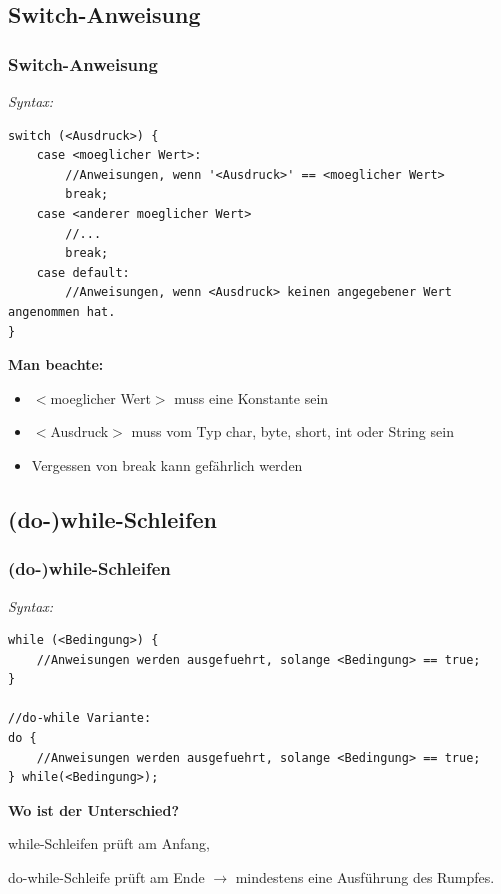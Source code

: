 \documentclass[18pt]{beamer}
\begin{document}
\subsection{Switch-Anweisung}
\begin{frame}[containsverbatim]
	\frametitle{Switch-Anweisung}
	
		\emph{Syntax:}
		\begin{lstlisting}
switch (<Ausdruck>) {
	case <moeglicher Wert>:
		//Anweisungen, wenn '<Ausdruck>' == <moeglicher Wert>
		break;
	case <anderer moeglicher Wert>
		//...
		break;
	case default:
		//Anweisungen, wenn <Ausdruck> keinen angegebener Wert angenommen hat.
}\end{lstlisting}
		\textbf{Man beachte:}
		\begin{itemize}
			\item $<$moeglicher Wert$>$ muss eine Konstante sein
			\item $<$Ausdruck$>$ muss vom Typ char, byte, short, int oder String sein
			\item Vergessen von break kann gefährlich werden
		\end{itemize}
\end{frame}


\subsection{(do-)while-Schleifen}
\begin{frame}[containsverbatim]
	\frametitle{(do-)while-Schleifen }
	
	\emph{Syntax:}
	\begin{lstlisting}
while (<Bedingung>) {
	//Anweisungen werden ausgefuehrt, solange <Bedingung> == true;
}
		
//do-while Variante:
do {
	//Anweisungen werden ausgefuehrt, solange <Bedingung> == true;
} while(<Bedingung>);
	\end{lstlisting}
	\textbf{Wo ist der Unterschied?} \pause
	
	while-Schleifen prüft am Anfang,
	
	do-while-Schleife prüft am Ende $\rightarrow$ mindestens eine Ausführung des Rumpfes.
\end{frame}

\end{document}
